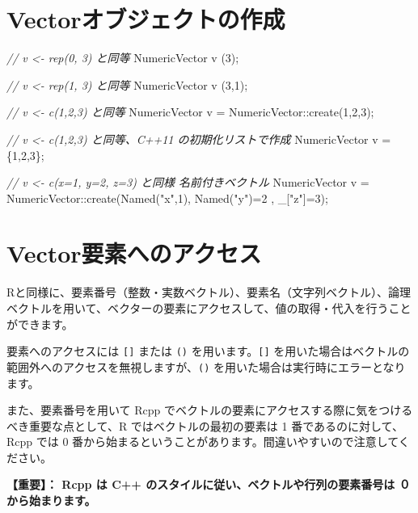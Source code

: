 \documentclass[]{book}
\newenvironment{Shaded}{\begin{snugshade}}{\end{snugshade}}
\newcommand{\CommentTok}[1]{\textcolor[rgb]{0.56,0.35,0.01}{\textit{#1}}}
\newcommand{\DecValTok}[1]{\textcolor[rgb]{0.00,0.00,0.81}{#1}}
\newcommand{\NormalTok}[1]{#1}
\newcommand{\StringTok}[1]{\textcolor[rgb]{0.31,0.60,0.02}{#1}}
\begin{document}
\hypertarget{vector}{%
\section{Vectorオブジェクトの作成}\label{vector}}

\begin{Shaded}
\begin{Highlighting}[]
\CommentTok{// v <- rep(0, 3) と同等}
\NormalTok{NumericVector v (}\DecValTok{3}\NormalTok{);}

\CommentTok{// v <- rep(1, 3) と同等}
\NormalTok{NumericVector v (}\DecValTok{3}\NormalTok{,}\DecValTok{1}\NormalTok{);}

\CommentTok{// v <- c(1,2,3) と同等}
\NormalTok{NumericVector v = NumericVector::create(}\DecValTok{1}\NormalTok{,}\DecValTok{2}\NormalTok{,}\DecValTok{3}\NormalTok{);}

\CommentTok{// v <- c(1,2,3) と同等、C++11 の初期化リストで作成}
\NormalTok{NumericVector v = \{}\DecValTok{1}\NormalTok{,}\DecValTok{2}\NormalTok{,}\DecValTok{3}\NormalTok{\};}

\CommentTok{// v <- c(x=1, y=2, z=3) と同様 名前付きベクトル}
\NormalTok{NumericVector v =}
\NormalTok{  NumericVector::create(Named(}\StringTok{"x"}\NormalTok{,}\DecValTok{1}\NormalTok{), Named(}\StringTok{"y"}\NormalTok{)=}\DecValTok{2}\NormalTok{ , _[}\StringTok{"z"}\NormalTok{]=}\DecValTok{3}\NormalTok{);}
\end{Highlighting}
\end{Shaded}

\hypertarget{vector}{%
\section{Vector要素へのアクセス}\label{vector}}

Rと同様に、要素番号（整数・実数ベクトル）、要素名（文字列ベクトル）、論理ベクトルを用いて、ベクターの要素にアクセスして、値の取得・代入を行うことができます。

要素へのアクセスには \texttt{{[}{]}} または \texttt{()} を用います。\texttt{{[}{]}} を用いた場合はベクトルの範囲外へのアクセスを無視しますが、\texttt{()} を用いた場合は実行時にエラーとなります。

また、要素番号を用いて Rcpp でベクトルの要素にアクセスする際に気をつけるべき重要な点として、R ではベクトルの最初の要素は 1 番であるのに対して、Rcpp では 0 番から始まるということがあります。間違いやすいので注意してください。

\textbf{【重要】： Rcpp は C++ のスタイルに従い、ベクトルや行列の要素番号は ０ から始まります。}
\end{document}
